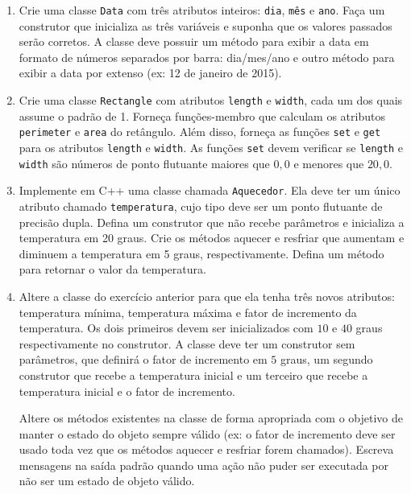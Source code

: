 \documentclass[fleqn]{article}
\begin{document}
\pagebreak
{}

\begin{enumerate}

   \item{
      Crie uma classe \texttt{Data} com três atributos inteiros: \texttt{dia}, \texttt{mês} e \texttt{ano}. Faça um construtor que inicializa as três variáveis e suponha que os valores passados serão corretos. A classe deve possuir um método para exibir a data em formato de números separados por barra: dia/mes/ano e outro método para exibir a data por extenso (ex: 12 de janeiro de 2015).
   }

   \item{
      Crie uma classe \texttt{Rectangle} com atributos \texttt{length} e \texttt{width}, cada um dos quais assume o padrão de 1. Forneça funções-membro que calculam os atributos \texttt{perimeter} e \texttt{area} do retângulo. Além disso, forneça as funções \texttt{set} e \texttt{get} para os atributos \texttt{length} e \texttt{width}. As funções \texttt{set} devem verificar se \texttt{length} e \texttt{width} são números de ponto flutuante maiores que $0,0$ e menores que $20,0$.
   }

   \item{
      Implemente em C++ uma classe chamada \texttt{Aquecedor}. Ela deve ter um único atributo chamado \texttt{temperatura}, cujo tipo deve ser um ponto flutuante de precisão dupla. Defina um construtor que não recebe parâmetros e inicializa a temperatura em 20 graus. Crie os métodos aquecer e resfriar que aumentam e diminuem a temperatura em 5 graus, respectivamente. Defina um método para retornar o valor da temperatura.
   }

   \item{
      Altere a classe do exercício anterior para que ela tenha três novos atributos: temperatura mínima, temperatura máxima e fator de incremento da temperatura. Os dois primeiros devem ser inicializados com $10$ e $40$ graus respectivamente no construtor. A classe deve ter um construtor sem parâmetros, que definirá o fator de incremento em $5$ graus, um segundo construtor que recebe a temperatura inicial e um terceiro que recebe a temperatura inicial e o fator de incremento.

      Altere os métodos existentes na classe de forma apropriada com o objetivo de manter o estado do objeto sempre válido (ex: o fator de incremento deve ser usado toda vez que os métodos aquecer e resfriar forem chamados). Escreva mensagens na saída padrão quando uma ação não puder ser executada por não ser um estado de objeto válido.

}
\end{enumerate}
\end{document}
